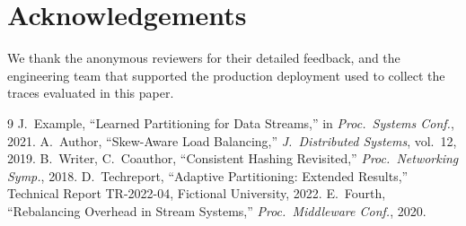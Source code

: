 \documentclass[10pt,twocolumn]{article}
\begin{document}
\section*{Acknowledgements}
We thank the anonymous reviewers for their detailed feedback, and the
engineering team that supported the production deployment used to collect
the traces evaluated in this paper.

\begin{thebibliography}{9}
 J.\ Example, ``Learned Partitioning for Data Streams,'' in
\emph{Proc.\ Systems Conf.}, 2021.
 A.\ Author, ``Skew-Aware Load Balancing,'' \emph{J.\ Distributed
Systems}, vol.\ 12, 2019.
 B.\ Writer, C.\ Coauthor, ``Consistent Hashing Revisited,''
\emph{Proc.\ Networking Symp.}, 2018.
 D.\ Techreport, ``Adaptive Partitioning: Extended Results,''
Technical Report TR-2022-04, Fictional University, 2022.
 E.\ Fourth, ``Rebalancing Overhead in Stream Systems,''
\emph{Proc.\ Middleware Conf.}, 2020.
\end{thebibliography}
\end{document}
